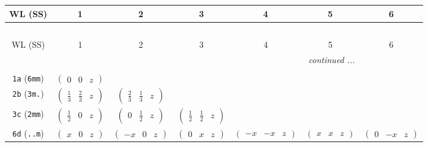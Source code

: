 \documentclass[fleqn,9pt,landscape]{jsarticle}
\begin{document}
\begin{center}
\renewcommand{\arraystretch}{1.2}
\begin{longtable}{ccccccc}
 \hline \hline
WL (SS) & 1 & 2 & 3 & 4 & 5 & 6 \\ \hline \endfirsthead

\multicolumn{6}{l}{\tablename\ \thetable{}} \\
 \hline \hline
WL (SS) & 1 & 2 & 3 & 4 & 5 & 6 \\ \hline \endhead

 \hline \hline
\multicolumn{6}{r}{\footnotesize\it continued ...} \\ \endfoot

 \hline \hline
\multicolumn{6}{r}{} \\ \endlastfoot

{\tt 1a} ({\tt 6mm}) & $ \begin{pmatrix} 0 & 0 & z \end{pmatrix} $ & $  $ & $  $ & $  $ & $  $ & $  $ \\ \hline
{\tt 2b} ({\tt 3m.}) & $ \begin{pmatrix} \frac{1}{3} & \frac{2}{3} & z \end{pmatrix} $ & $ \begin{pmatrix} \frac{2}{3} & \frac{1}{3} & z \end{pmatrix} $ & $  $ & $  $ & $  $ & $  $ \\ \hline
{\tt 3c} ({\tt 2mm}) & $ \begin{pmatrix} \frac{1}{2} & 0 & z \end{pmatrix} $ & $ \begin{pmatrix} 0 & \frac{1}{2} & z \end{pmatrix} $ & $ \begin{pmatrix} \frac{1}{2} & \frac{1}{2} & z \end{pmatrix} $ & $  $ & $  $ & $  $ \\ \hline
{\tt 6d} ({\tt ..m}) & $ \begin{pmatrix} x & 0 & z \end{pmatrix} $ & $ \begin{pmatrix} - x & 0 & z \end{pmatrix} $ & $ \begin{pmatrix} 0 & x & z \end{pmatrix} $ & $ \begin{pmatrix} - x & - x & z \end{pmatrix} $ & $ \begin{pmatrix} x & x & z \end{pmatrix} $ & $ \begin{pmatrix} 0 & - x & z \end{pmatrix} $ \\ \hline

\end{longtable}
\end{center}
\end{document}
